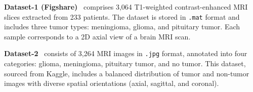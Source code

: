 \documentclass[a4paper,fleqn]{cas-sc}
\begin{document}
\begin{table}[!htbp]
\centering
\caption{Summary of Class Distributions and Formats Across All Four Datasets}
\label{tab:combined_datasets}
\end{table}

\textbf{Dataset-1 (Figshare)}~\cite{R38} comprises 3,064 T1-weighted contrast-enhanced MRI slices extracted from 233 patients. The dataset is stored in \texttt{.mat} format and includes three tumor types: meningioma, glioma, and pituitary tumor. Each sample corresponds to a 2D axial view of a brain MRI scan.

\textbf{Dataset-2}~\cite{R39} consists of 3,264 MRI images in \texttt{.jpg} format, annotated into four categories: glioma, meningioma, pituitary tumor, and no tumor. This dataset, sourced from Kaggle, includes a balanced distribution of tumor and non-tumor images with diverse spatial orientations (axial, sagittal, and coronal).
\end{document}
